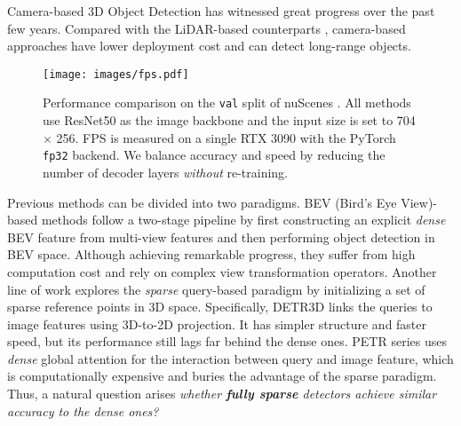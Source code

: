 \documentclass[10pt,twocolumn,letterpaper]{article}
\begin{document}
Camera-based 3D Object Detection \cite{bevdet, detr3d, petr, bevdet4d, bevdepth, bevformer, solofusion} has witnessed great progress over the past few years. Compared with the LiDAR-based counterparts \cite{pointpillars, centerpoint, largekernel3d, link}, camera-based approaches have lower deployment cost and can detect long-range objects.

\begin{figure}[t]
\texttt{[image: images/fps.pdf]}
  \vspace{-5pt}
  \caption{Performance comparison on the \texttt{val} split of nuScenes \cite{nuscenes}. All methods use ResNet50 \cite{resnet} as the image backbone and the input size is set to 704 $\times$ 256. FPS is measured on a single RTX 3090 with the PyTorch \texttt{fp32} backend. We balance accuracy and speed by reducing the number of decoder layers \textit{without} re-training.}
  \vspace{-10pt}
  \label{fig:intro}
\end{figure}

Previous methods can be divided into two paradigms. BEV (Bird's Eye View)-based methods \cite{bevdet, bevdet4d, bevformer, bevdepth, solofusion} follow a two-stage pipeline by first constructing an explicit \textit{dense} BEV feature from multi-view features and then performing object detection in BEV space. Although achieving remarkable progress, they suffer from high computation cost and rely on complex view transformation operators.
Another line of work \cite{detr3d, petr, petrv2} explores the \textit{sparse} query-based paradigm by initializing a set of sparse reference points in 3D space. Specifically, DETR3D \cite{detr3d} links the queries to image features using 3D-to-2D projection. It has simpler structure and faster speed, but its performance still lags far behind the dense ones. PETR series \cite{petr, petrv2} uses \textit{dense} global attention for the interaction between query and image feature, which is computationally expensive and buries the advantage of the sparse paradigm.
Thus, a natural question arises {\em whether {\bf fully sparse} detectors achieve similar accuracy to the dense ones?}
\end{document}
